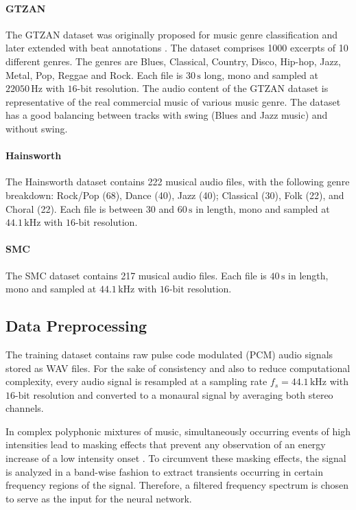 \documentclass{scrartcl}
\begin{document}
\paragraph{GTZAN} 
The GTZAN \cite{Tzanetakis2002b} dataset was originally proposed for music genre classification and later extended with beat annotations \cite{marchand2015swing}. The dataset comprises 1000 excerpts of 10 different genres. The genres are Blues, Classical, Country, Disco, Hip-hop, Jazz, Metal, Pop, Reggae and Rock. Each file is $30\,\text{s}$ long, mono and sampled at $22050\,\text{Hz}$ with $16\text{-bit}$ resolution. The audio content of the GTZAN dataset is representative of the real commercial music of various music genre. The dataset has a good balancing between tracks with swing (Blues and Jazz music) and without swing.

\paragraph{Hainsworth} 
The Hainsworth dataset \cite{Hainsworth2004} contains 222 musical audio files, with the following genre breakdown: Rock/Pop (68), Dance (40), Jazz (40); Classical (30), Folk (22), and Choral (22). Each file is between $30$ and $60\,\text{s}$ in length, mono and sampled at $44.1\,\text{kHz}$ with $16\text{-bit}$ resolution.

\paragraph{SMC}
The SMC dataset \cite{Holzapfel2012} contains 217 musical audio files. Each file is $40 \,\text{s}$ in length, mono and sampled at $44.1\,\text{kHz}$ with $16\text{-bit}$ resolution.


\subsection{Data Preprocessing}

The training dataset contains raw pulse code modulated (PCM) audio signals stored as WAV files. For the sake of consistency and also to reduce computational complexity, every audio signal is resampled at a sampling rate $f_s = 44.1 \,\text{kHz}$ with $16\text{-bit}$ resolution and converted to a monaural signal by averaging both stereo channels. 

In complex polyphonic mixtures of music, simultaneously occurring events of high intensities lead to masking effects that prevent any observation of an energy increase of a low intensity onset \cite{Grosche2010}. To circumvent these masking effects, the signal is analyzed in a band-wise fashion to extract transients occurring in certain frequency regions of the signal. Therefore, a filtered frequency spectrum is chosen to serve as the input for the neural network.
\end{document}
